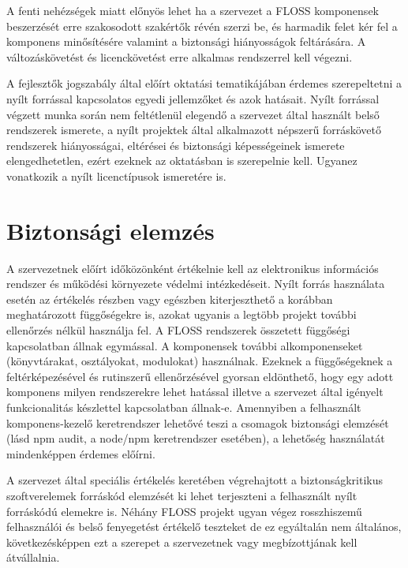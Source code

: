 \documentclass[12pt,magyar,a4paper,oneside]{scrreprt}
\begin{document}
A fenti nehézségek miatt előnyös lehet ha a szervezet a FLOSS
komponensek beszerzését erre szakosodott szakértők révén szerzi be, és
harmadik felet kér fel a komponens minősítésére valamint a biztonsági
hiányosságok feltárására. A változáskövetést és licenckövetést erre
alkalmas rendszerrel kell végezni.

A fejlesztők jogszabály által előírt oktatási tematikájában érdemes
szerepeltetni a nyílt forrással kapcsolatos egyedi jellemzőket és azok
hatásait. Nyílt forrással végzett munka során nem feltétlenül elegendő a
szervezet által használt belső rendszerek ismerete, a nyílt projektek
által alkalmazott népszerű forráskövető rendszerek hiányosságai,
eltérései és biztonsági képességeinek ismerete elengedhetetlen, ezért
ezeknek az oktatásban is szerepelnie kell. Ugyanez vonatkozik a nyílt
licenctípusok ismeretére is.

\hypertarget{biztonsuxe1gi-elemzuxe9s}{%
\section{Biztonsági elemzés}\label{biztonsuxe1gi-elemzuxe9s}}

A szervezetnek előírt időközönként értékelnie kell az elektronikus
információs rendszer és működési környezete védelmi intézkedéseit. Nyílt
forrás használata esetén az értékelés részben vagy egészben
kiterjeszthető a korábban meghatározott függőségekre is, azokat ugyanis
a legtöbb projekt további ellenőrzés nélkül használja fel. A FLOSS
rendszerek összetett függőségi kapcsolatban állnak egymással. A
komponensek további alkomponenseket (könyvtárakat, osztályokat,
modulokat) használnak. Ezeknek a függőségeknek a feltérképezésével és
rutinszerű ellenőrzésével gyorsan eldönthető, hogy egy adott komponens
milyen rendszerekre lehet hatással illetve a szervezet által igényelt
funkcionalitás készlettel kapcsolatban állnak-e. Amennyiben a
felhasznált komponens-kezelő keretrendszer lehetővé teszi a csomagok
biztonsági elemzését (lásd npm audit, a node/npm keretrendszer
esetében), a lehetőség használatát mindenképpen érdemes előírni.

A szervezet által speciális értékelés keretében végrehajtott a
biztonságkritikus szoftverelemek forráskód elemzését ki lehet
terjeszteni a felhasznált nyílt forráskódú elemekre is. Néhány FLOSS
projekt ugyan végez rosszhiszemű felhasználói és belső fenyegetést
értékelő teszteket de ez egyáltalán nem általános, következésképpen ezt
a szerepet a szervezetnek vagy megbízottjának kell átvállalnia.
\end{document}

